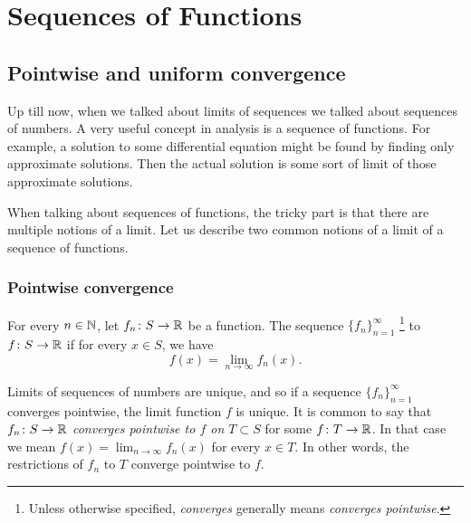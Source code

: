 \chapter{Sequences of Functions} \label{fs:chapter}


\section{Pointwise and uniform convergence}
\label{sec:puconv}



Up till now, when we talked about limits of sequences we talked about
sequences of numbers.
A very useful concept in analysis is a sequence of functions.
For example, a solution to some differential equation
might be found by finding only approximate solutions.
Then the actual solution is some sort of limit of those approximate solutions.

When talking about sequences of functions, the 
tricky part is that there are multiple notions of a limit.
Let us describe two common
notions of a limit of a sequence of functions.

\subsection{Pointwise convergence}

\begin{defn}
For every $n \in {\mathbb{N}}$,
let $f_n \colon S \to {\mathbb{R}}$ be a function.  The sequence
$\{ f_n \}_{n=1}^\infty$
\emph{}\footnote{Unless otherwise specified,
\emph{converges} generally means \emph{converges pointwise}.}
to $f \colon S \to {\mathbb{R}}$ if for every $x
\in S$,
we have
\begin{equation*}
f(x) =
\lim_{n\to\infty} f_n(x) .
\end{equation*}
\end{defn}

Limits of sequences of numbers are unique, and so if a sequence
$\{ f_n \}_{n=1}^\infty$
converges pointwise, the limit function $f$ is unique.
It is common to say that $f_n \colon S \to {\mathbb{R}}$
\emph{converges pointwise to $f$ on $T \subset S$}
for some $f \colon T \to {\mathbb{R}}$.  In that case we mean 
$f(x) = \lim_{n\to\infty} f_n(x)$ for every $x \in T$.  In other words, the
restrictions of $f_n$ to $T$ converge pointwise to $f$.



